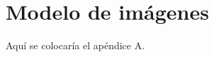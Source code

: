 
\chapter{Modelo de imágenes} \label{imagenes}
\blankpage

Aquí se colocaría el apéndice A.



\blankpage